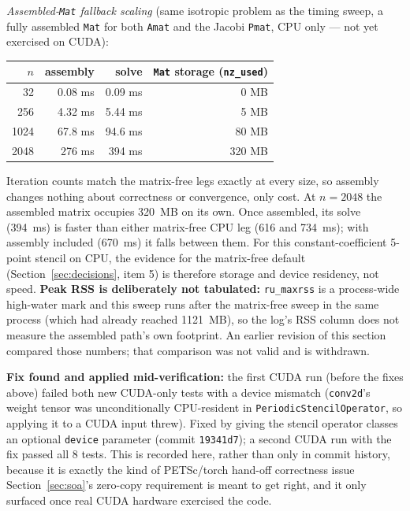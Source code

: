 \documentclass[11pt]{article}
\begin{document}
\textit{Assembled-\texttt{Mat} fallback scaling} (same isotropic problem as
the timing sweep, a fully assembled \texttt{Mat} for both \texttt{Amat} and
the Jacobi \texttt{Pmat}, CPU only --- not yet exercised on CUDA):

\begin{center}
\footnotesize
\begin{tabular}{rrrr}
\toprule
$n$ & assembly & solve & \texttt{Mat} storage (\texttt{nz\_used}) \\
\midrule
32 & 0.08 ms & 0.09 ms & 0 MB \\
256 & 4.32 ms & 5.44 ms & 5 MB \\
1024 & 67.8 ms & 94.6 ms & 80 MB \\
2048 & 276 ms & 394 ms & 320 MB \\
\bottomrule
\end{tabular}
\end{center}

Iteration counts match the matrix-free legs exactly at every size, so
assembly changes nothing about correctness or convergence, only cost. At
$n=2048$ the assembled matrix occupies 320~MB on its own. Once assembled,
its solve (394~ms) is faster than either matrix-free CPU leg (616 and
734~ms); with assembly included (670~ms) it falls between them. For this
constant-coefficient 5-point stencil on CPU, the evidence for the
matrix-free default (Section~\ref{sec:decisions}, item 5) is therefore
storage and device residency, not speed. \textbf{Peak RSS is deliberately
not tabulated:} \texttt{ru\_maxrss} is a process-wide high-water mark and
this sweep runs after the matrix-free sweep in the same process (which had
already reached 1121~MB), so the log's RSS column does not measure the
assembled path's own footprint. An earlier revision of this section
compared those numbers; that comparison was not valid and is withdrawn.

\textbf{Fix found and applied mid-verification:} the first CUDA run
(before the fixes above) failed both new CUDA-only tests with a device
mismatch (\texttt{conv2d}'s weight tensor was unconditionally CPU-resident
in \texttt{PeriodicStencilOperator}, so applying it to a CUDA input threw).
Fixed by giving the stencil operator classes an optional \texttt{device}
parameter (commit \texttt{19341d7}); a second CUDA run with the fix passed
all 8 tests. This is recorded here, rather than only in commit history,
because it is exactly the kind of PETSc/torch hand-off correctness issue
Section~\ref{sec:soa}'s zero-copy requirement is meant to get right, and it
only surfaced once real CUDA hardware exercised the code.
\end{document}
